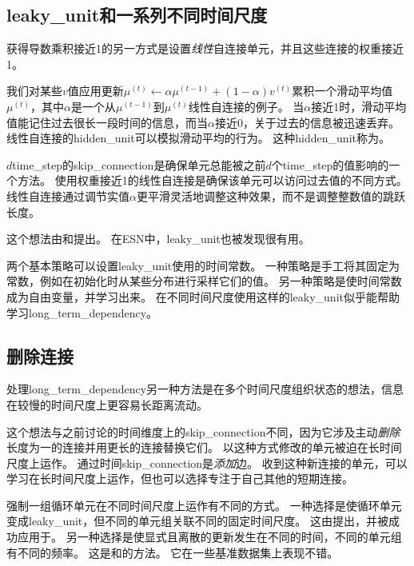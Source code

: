 
\subsection{\gls{leaky_unit}和一系列不同时间尺度}
\label{sec:leaky_units_and_a_spectrum_of_different_time_scales}
获得导数乘积接近1的另一方式是设置\emph{线性}自连接单元，并且这些连接的权重接近1。

我们对某些$v$值应用更新$\mu^{(t)} \gets \alpha \mu^{(t-1)} + (1-\alpha) v^{(t)}$累积一个滑动平均值$\mu^{(t)}$，其中$\alpha$是一个从$ \mu^{(t-1)}$到$ \mu^{(t)}$线性自连接的例子。
当$\alpha$接近1时，滑动平均值能记住过去很长一段时间的信息，而当$\alpha$接近0，关于过去的信息被迅速丢弃。
线性自连接的\gls{hidden_unit}可以模拟滑动平均的行为。
这种\gls{hidden_unit}称为。

$d$\gls{time_step}的\gls{skip_connection}是确保单元总能被之前$d$个\gls{time_step}的值影响的一个方法。
使用权重接近1的线性自连接是确保该单元可以访问过去值的不同方式。
线性自连接通过调节实值$\alpha$更平滑灵活地调整这种效果，而不是调整整数值的跳跃长度。

这个想法由\cite{Mozer-nips92}和\cite{ElHihi+Bengio-nips8}提出。
在\gls{ESN}中，\gls{leaky_unit}也被发现很有用\citep{JaegerLPS07}。

两个基本策略可以设置\gls{leaky_unit}使用的时间常数。
一种策略是手工将其固定为常数，例如在初始化时从某些分布进行采样它们的值。
另一种策略是使时间常数成为自由变量，并学习出来。
在不同时间尺度使用这样的\gls{leaky_unit}似乎能帮助学习\gls{long_term_dependency}\citep{Mozer-nips92,Pascanu+al-ICML2013-small}。

\subsection{删除连接}
\label{sec:removing_connections}
处理\gls{long_term_dependency}另一种方法是在多个时间尺度组织状态的想法\citep{ElHihi+Bengio-nips8}，信息在较慢的时间尺度上更容易长距离流动。

这个想法与之前讨论的时间维度上的\gls{skip_connection}不同，因为它涉及主动\emph{删除}长度为一的连接并用更长的连接替换它们。
以这种方式修改的单元被迫在长时间尺度上运作。
通过时间\gls{skip_connection}是\emph{添加}边。
收到这种新连接的单元，可以学习在长时间尺度上运作，但也可以选择专注于自己其他的短期连接。


强制一组循环单元在不同时间尺度上运作有不同的方式。
一种选择是使循环单元变成\gls{leaky_unit}，但不同的单元组关联不同的固定时间尺度。
这由\cite{Mozer-nips92}提出，并被成功应用于\cite{Pascanu+al-ICML2013-small}。
另一种选择是使显式且离散的更新发生在不同的时间，不同的单元组有不同的频率。
这是\cite{ElHihi+Bengio-nips8}和\cite{Koutnik-et-al-ICML2014}的方法。
它在一些基准数据集上表现不错。

